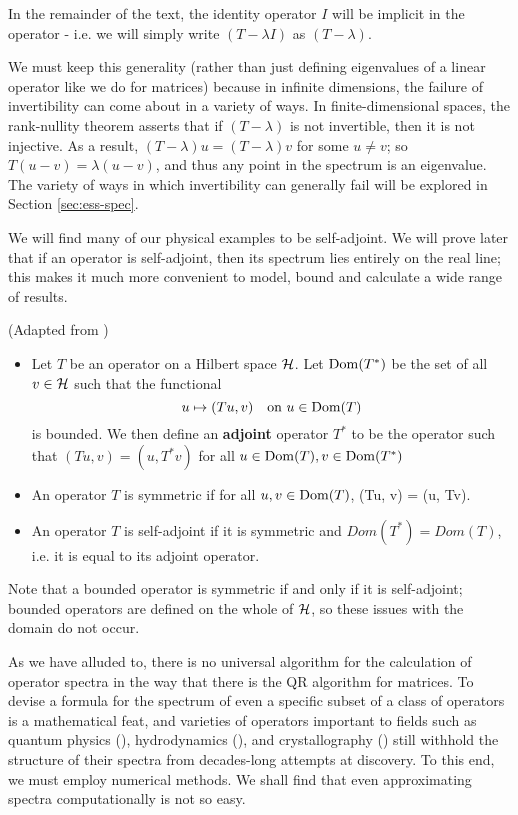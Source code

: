 \documentclass[../main.tex]{subfiles}
\begin{document}
In the remainder of the text, the identity operator $I$ will be implicit in the
operator - i.e. we will simply write $(T - \lambda I)$ as $(T - \lambda)$.

We must keep this generality (rather than just defining eigenvalues of a linear
operator like we do for matrices) because in infinite dimensions, the failure of
invertibility can come about in a variety of ways. In finite-dimensional spaces,
the rank-nullity theorem asserts that if $(T - \lambda)$ is not invertible, then
it is not injective. As a result, $(T - \lambda)u = (T - \lambda)v$ for some $u
\neq v$; so $T(u - v) = \lambda(u-v)$, and thus any point in the spectrum is an
eigenvalue. The variety of ways in which invertibility can generally fail will
be explored in Section \ref{sec:ess-spec}.

We will find many of our physical examples to be self-adjoint. We will prove
later that if an operator is self-adjoint, then its spectrum lies entirely on
the real line; this makes it much more convenient to model, bound and calculate
a wide range of results.

\begin{definition}
(Adapted from \cite{hall2013quantum})
  \begin{itemize}
  \item Let $T$ be an operator on a Hilbert space $\mathcal{H}$. Let $\mathrm{Dom}(T^*)$ be
    the set of all $v \in \mathcal{H}$ such that the functional
	    $$u \mapsto (Tu, v) \quad \text{on $u \in \mathrm{Dom}(T)$}$$
    is bounded. We then define an \textbf{adjoint} operator $T^*$ to be the
    operator such that 
    $(Tu, v) = (u, T^*v)$ for all $u \in \mathrm{Dom}(T), v \in \mathrm{Dom}(T^*)$ 
  \item An operator $T$ is symmetric if 
    for all $u, v \in \mathrm{Dom}(T)$, (Tu, v) = (u, Tv).
  \item An operator $T$ is self-adjoint if it is symmetric and $Dom(T^*) =
    Dom(T)$, i.e. it is equal to its adjoint operator.
  \end{itemize}
\end{definition}

Note that a bounded operator is symmetric if and only if it is self-adjoint;
bounded operators are defined on the whole of $\mathcal{H}$, so these issues with
the domain do not occur. 

As we have alluded to, there is no universal algorithm for the calculation of
operator spectra in the way that there is the QR algorithm
\cite{suli2003introduction} for matrices. To devise a formula for the spectrum
of even a specific subset of a class of operators is a mathematical feat, and
varieties of operators important to fields such as quantum physics
(\cite{lewin2010spectral}), hydrodynamics (\cite{manning2008descriptor}), and
crystallography (\cite{cances2012periodic}) still withhold the structure of
their spectra from decades-long attempts at discovery. 
To this end, we must employ numerical methods.
We shall find that even approximating spectra computationally is not so easy.
\end{document}
